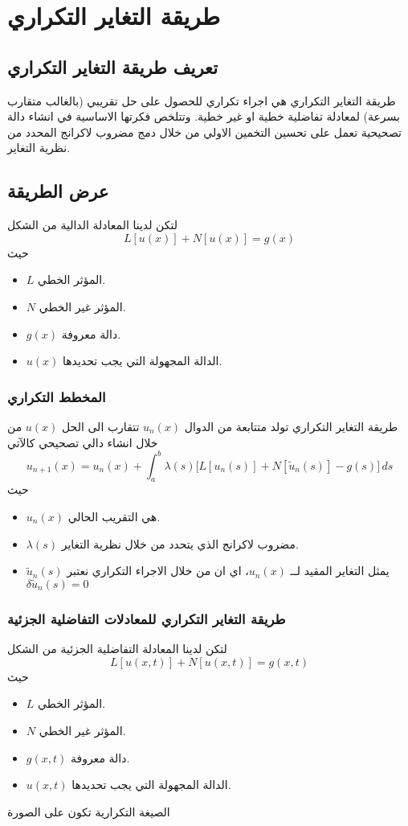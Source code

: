 \chapter{طريقة التغاير التكراري}

\section{تعريف طريقة التغاير التكراري}

طريقة التغاير التكراري هي اجراء تكراري للحصول على حل تقريبي (بالغالب متقارب بسرعة) لمعادلة تفاضلية خطية او غير خطية. وتتلخص فكرتها الاساسية في انشاء دالة تصحيحية تعمل على تحسين التخمين الاولي من خلال دمج مضروب لاكرانج المحدد من نظرية التغاير.

\section{عرض الطريقة}

لتكن لدينا المعادلة الدالية من الشكل 
\[
L[u(x)] + N[u(x)] = g(x)
\]
حيث
\begin{itemize}
	\item $L$ المؤثر الخطي.
	\item $N$ المؤثر غير الخطي.
	\item $g(x)$ دالة معروفة.
	\item $u(x)$ الدالة المجهولة التي يجب تحديدها.
\end{itemize}

\subsection*{المخطط التكراري}

طريقة التغاير التكراري تولد متتابعة من الدوال $u_n(x)$ تتقارب الى الحل $u(x)$ من خلال انشاء دالي تصحيحي كالآتي
\[
u_{n+1}(x) = u_n(x) + \int_a^b \lambda(s) \big[L[u_n(s)] + N[\tilde{u}_n(s)] - g(s)\big] \, ds
\]
حيث
\begin{itemize}
	\item $u_n(x)$ هي التقريب الحالي.
	\item $\lambda(s)$ مضروب لاكرانج الذي يتحدد من خلال نظرية التغاير.
	\item $\tilde{u}_n(s)$ يمثل التغاير المقيد لــ $u_n(x)$، اي ان من خلال الاجراء التكراري نعتبر $\delta\tilde{u}_n(s) = 0$
\end{itemize}

\subsection*{طريقة التغاير التكراري للمعادلات التفاضلية الجزئية}
لتكن لدينا المعادلة التفاضلية الجزئية من الشكل
\[
L[u(x, t)] + N[u(x, t)] = g(x, t)
\]
حيث
\begin{itemize}
	\item $L$ المؤثر الخطي.
	\item $N$ المؤثر غير الخطي.
	\item $g(x, t)$ دالة معروفة.
	\item $u(x, t)$ الدالة المجهولة التي يجب تحديدها.
\end{itemize}
الصيغة التكرارية تكون على الصورة

